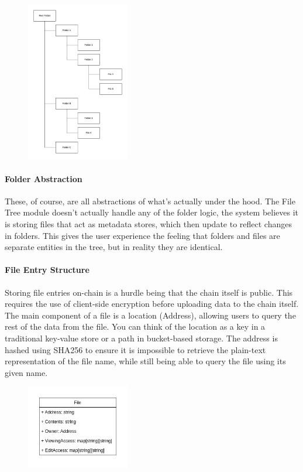 \documentclass[a4paper]{article}
\begin{document}
\begin{figure}[!htbp]
\centering
\includegraphics[width=0.4\textwidth]{assets/filetree1.png}
\end{figure}

\paragraph{Folder Abstraction}
These, of course, are all abstractions of what's actually under the hood. The File Tree module doesn't actually handle any of the folder logic, the system believes it is storing files that act as metadata stores, which then update to reflect changes in folders. This gives the user experience the feeling that folders and files are separate entities in the tree, but in reality they are identical.

\paragraph{File Entry Structure}
Storing file entries on-chain is a hurdle being that the chain itself is public. This requires the use of client-side encryption before uploading data to the chain itself. The main component of a file is a location (Address), allowing users to query the rest of the data from the file. You can think of the location as a key in a traditional key-value store or a path in bucket-based storage. The address is hashed using SHA256 to ensure it is impossible to retrieve the plain-text representation of the file name, while still being able to query the file using its given name. 

\begin{figure}[!htbp]
\centering
\includegraphics[width=0.4\textwidth]{assets/filetree2.png}
\end{figure}
\end{document}
